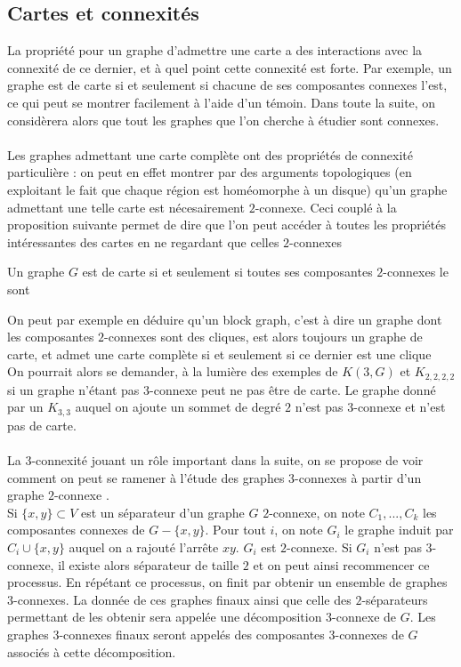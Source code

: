 \documentclass{scrartcl}
\begin{document}
\begin{flushleft}
\subsection{Cartes et connexités}\label{cartesetconnex}

La propriété pour un graphe d'admettre une carte a des interactions avec la connexité de ce dernier, et à quel point cette connexité
est forte. Par exemple, un graphe est de carte si et seulement si chacune de ses composantes connexes l'est, ce qui peut se montrer
facilement à l'aide d'un témoin. Dans toute la suite, on considèrera alors que tout les graphes que l'on cherche à étudier sont connexes.
\\~\\
Les graphes admettant une carte complète ont des propriétés de connexité particulière : on peut en effet montrer par des arguments
topologiques (en exploitant le fait que chaque région est homéomorphe à un disque) qu'un graphe admettant une telle carte
est nécesairement $2$-connexe. Ceci couplé à la proposition suivante permet de dire que l'on peut accéder à toutes les propriétés
intéressantes des cartes en ne regardant que celles $2$-connexes

\begin{prop}\label{suffbiconn}\cite{FptMap}
    Un graphe $G$ est de carte si et seulement si toutes ses composantes $2$-connexes le sont
\end{prop}

On peut par exemple en déduire qu'un block graph, c'est à dire un graphe dont les composantes $2$-connexes sont des cliques,
est alors toujours un graphe de carte, et admet une carte complète si et seulement si ce dernier est une clique\\
On pourrait alors se demander, à la lumière des exemples de $K(3,G)$ et $K_{2,2,2,2}$ si un graphe n'étant pas $3$-connexe
peut ne pas être de carte. Le graphe donné par un $K_{3,3}$ auquel on ajoute un sommet de degré $2$ n'est pas $3$-connexe
et n'est pas de carte.
\\~\\
La $3$-connexité jouant un rôle important dans la suite, on se propose de voir comment on peut se ramener à l'étude des
graphes $3$-connexes à partir d'un graphe $2$-connexe \cite{3connComp}.\\
Si $\{x,y\} \subset V$ est un séparateur d'un graphe $G$ $2$-connexe, on note $C_1, ..., C_k$ les composantes connexes de
$G - \{x,y\}$. Pour tout $i$, on note $G_i$ le graphe induit par $C_i \cup \{x,y\}$ auquel on a rajouté l'arrête $xy$.
$G_i$ est $2$-connexe. Si $G_i$ n'est pas $3$-connexe, il existe alors séparateur de taille $2$ et on peut ainsi recommencer
ce processus. En répétant ce processus, on finit par obtenir un ensemble de graphes $3$-connexes. La donnée de ces graphes finaux
ainsi que celle des $2$-séparateurs permettant de les obtenir sera appelée une décomposition $3$-connexe de $G$.
Les graphes $3$-connexes finaux seront appelés des composantes $3$-connexes de $G$ associés à cette décomposition.


\end{flushleft}
\end{document}

